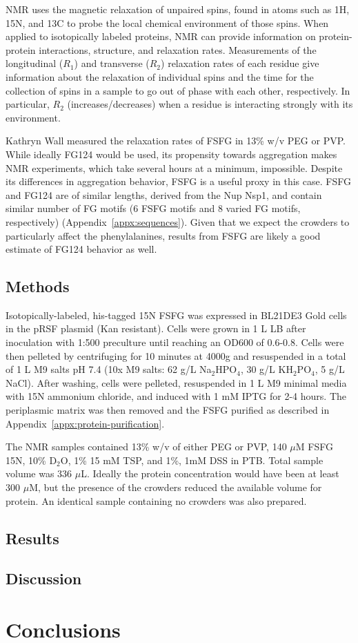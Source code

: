 NMR uses the magnetic relaxation of unpaired spins, found in atoms such as 1H, 15N, and 13C to probe the local chemical environment of those spins.  When applied to isotopically labeled proteins, NMR can provide information on protein-protein interactions, structure, and relaxation rates.  Measurements of the longitudinal ($R_1$) and transverse ($R_2$) relaxation rates of each residue give information about the relaxation of individual spins and the time for the collection of spins in a sample to go out of phase with each other, respectively.  In particular, $R_2$ (increases/decreases) when a residue is interacting strongly with its environment.

Kathryn Wall measured the relaxation rates of FSFG in 13\% w/v PEG or PVP.  While ideally FG124 would be used, its propensity towards aggregation makes NMR experiments, which take several hours at a minimum, impossible.  Despite its differences in aggregation behavior, FSFG is a useful proxy in this case.  FSFG and FG124 are of similar lengths, derived from the Nup Nsp1, and contain similar number of FG motifs (6 FSFG motifs and 8 varied FG motifs, respectively) (Appendix~\ref{appx:sequences}).  Given that we expect the crowders to particularly affect the phenylalanines, results from FSFG are likely a good estimate of FG124 behavior as well.

\subsection{Methods}

Isotopically-labeled, his-tagged 15N FSFG was expressed in BL21DE3 Gold cells in the pRSF plasmid (Kan resistant).  Cells were grown in 1 L LB after inoculation with 1:500 preculture until reaching an OD600 of 0.6-0.8.  Cells were then pelleted by centrifuging for 10 minutes at 4000g and resuspended in a total of 1 L M9 salts pH 7.4 (10x M9 salts: 62 g/L Na$_2$HPO$_4$, 30 g/L KH$_2$PO$_4$, 5 g/L NaCl).  After washing, cells were pelleted, resuspended in 1 L M9 minimal media with 15N ammonium chloride, and induced with 1 mM IPTG for 2-4 hours.  The periplasmic matrix was then removed and the FSFG purified as described in Appendix~\ref{appx:protein-purification}.


The NMR samples contained 13\% w/v of either PEG or PVP, 140 $\mu$M FSFG 15N, 10\% D$_2$O, 1\% 15 mM TSP, and 1\%, 1mM DSS in PTB.  Total sample volume was 336 $\mu$L.  Ideally the protein concentration would have been at least 300 $\mu$M, but the presence of the crowders reduced the available volume for protein.  An identical sample containing no crowders was also prepared.

\subsection{Results}
\subsection{Discussion}


\section{Conclusions}


